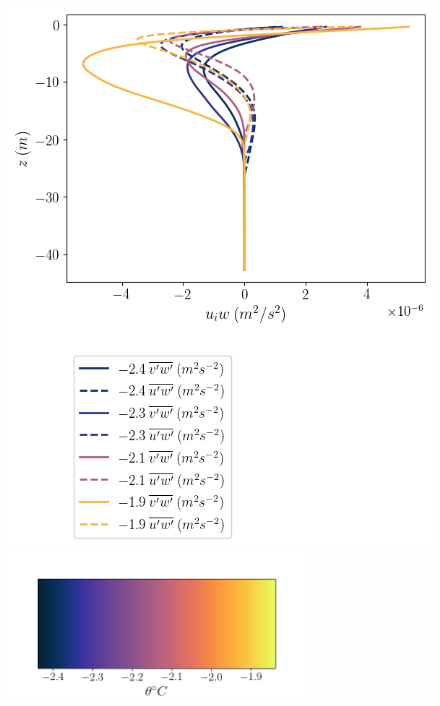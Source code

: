 \begin{figure}
\begin{minipage}{0.5\textwidth}
    \end{minipage}
    \begin{minipage}{0.5\textwidth}
        \includegraphics[trim={0 7.5cm 0 0},clip,width=\textwidth]{Figures/momflux_cmp_dT_44h_tav12_z_profile.png}
        \centering \includegraphics[width=0.7\textwidth,trim={1cm 0cm 1cm 5cm}, clip]{Figures/colorbar_thermal_driving.png}
    \end{minipage}%
    \begin{minipage}{0.5\textwidth}

\end{minipage}
\end{figure}
